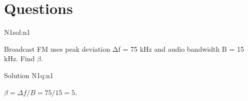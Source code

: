 
\section{Questions}
\label{sec:questions}

\label{q:n1}

\begin{questionbox}{N1}{sol:n1}

Broadcast FM uses peak deviation Δf = 75 kHz and audio bandwidth B = 15 kHz. Find \texorpdfstring{$\beta$}{β}.

\end{questionbox}

\label{sol:n1}

\begin{solutionbox}{Solution N1}{q:n1}

$\beta = \Delta f/B = 75/15 = 5$.

\end{solutionbox}

